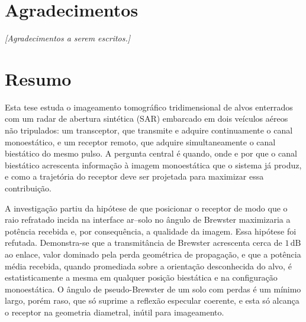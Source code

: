 \documentclass[12pt,a4paper,oneside]{book}
\theoremstyle{remark}
\newcommand{\dB}{\,\mathrm{dB}}
\theoremstyle{plain}
\theoremstyle{definition}
\begin{document}
\chapter*{Agradecimentos}


\textit{[Agradecimentos a serem escritos.]}

\chapter*{Resumo}

Esta tese estuda o imageamento tomográfico tridimensional de alvos enterrados
com um radar de abertura sintética (SAR) embarcado em dois veículos aéreos não
tripulados: um transceptor, que transmite e adquire continuamente o canal
monoestático, e um receptor remoto, que adquire simultaneamente o canal
biestático do mesmo pulso. A pergunta central é quando, onde e por que o canal
biestático acrescenta informação à imagem monoestática que o sistema já produz,
e como a trajetória do receptor deve ser projetada para maximizar essa
contribuição.

A investigação partiu da hipótese de que posicionar o receptor de modo que o
raio refratado incida na interface ar--solo no ângulo de Brewster maximizaria a
potência recebida e, por consequência, a qualidade da imagem. Essa hipótese foi
refutada. Demonstra-se que a transmitância de Brewster acrescenta cerca de
$1\dB$ ao enlace, valor dominado pela perda geométrica de propagação, e que a
potência média recebida, quando promediada sobre a orientação desconhecida do
alvo, é estatisticamente a mesma em qualquer posição biestática e na
configuração monoestática. O ângulo de pseudo-Brewster de um solo com perdas é
um mínimo largo, porém raso, que só suprime a reflexão especular coerente, e
esta só alcança o receptor na geometria diametral, inútil para imageamento.
\end{document}
